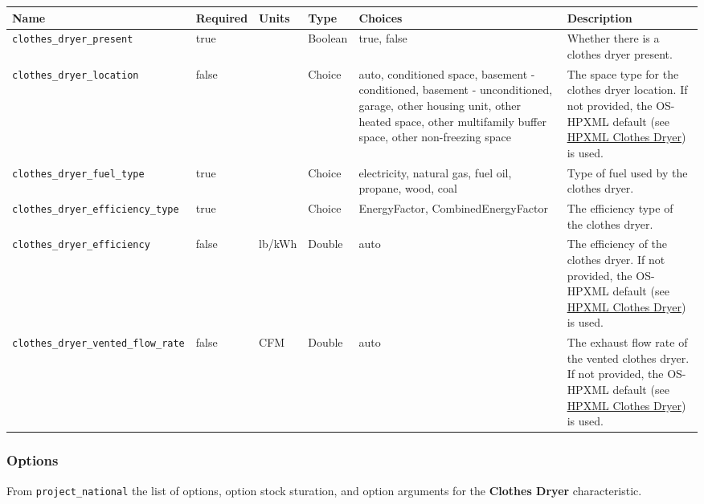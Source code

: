 \begin{longtable}[]{@{}llllll@{}}
\toprule\noalign{}
Name & Required & Units & Type & Choices & Description \\
\midrule\noalign{}
\endhead
\bottomrule\noalign{}
\endlastfoot
\texttt{clothes\_dryer\_present} & true & & Boolean & true, false &
Whether there is a clothes dryer present. \\
\texttt{clothes\_dryer\_location} & false & & Choice & auto, conditioned
space, basement - conditioned, basement - unconditioned, garage, other
housing unit, other heated space, other multifamily buffer space, other
non-freezing space & The space type for the clothes dryer location. If
not provided, the OS-HPXML default (see
\href{https://openstudio-hpxml.readthedocs.io/en/v1.7.0/workflow_inputs.html\#hpxml-clothes-dryer}{HPXML
Clothes Dryer}) is used. \\
\texttt{clothes\_dryer\_fuel\_type} & true & & Choice & electricity,
natural gas, fuel oil, propane, wood, coal & Type of fuel used by the
clothes dryer. \\
\texttt{clothes\_dryer\_efficiency\_type} & true & & Choice &
EnergyFactor, CombinedEnergyFactor & The efficiency type of the clothes
dryer. \\
\texttt{clothes\_dryer\_efficiency} & false & lb/kWh & Double & auto &
The efficiency of the clothes dryer. If not provided, the OS-HPXML
default (see
\href{https://openstudio-hpxml.readthedocs.io/en/v1.7.0/workflow_inputs.html\#hpxml-clothes-dryer}{HPXML
Clothes Dryer}) is used. \\
\texttt{clothes\_dryer\_vented\_flow\_rate} & false & CFM & Double &
auto & The exhaust flow rate of the vented clothes dryer. If not
provided, the OS-HPXML default (see
\href{https://openstudio-hpxml.readthedocs.io/en/v1.7.0/workflow_inputs.html\#hpxml-clothes-dryer}{HPXML
Clothes Dryer}) is used. \\
\end{longtable}

\subsubsection{Options}\label{options-15}

From \texttt{project\_national} the list of options, option stock
sturation, and option arguments for the \textbf{Clothes Dryer}
characteristic.

